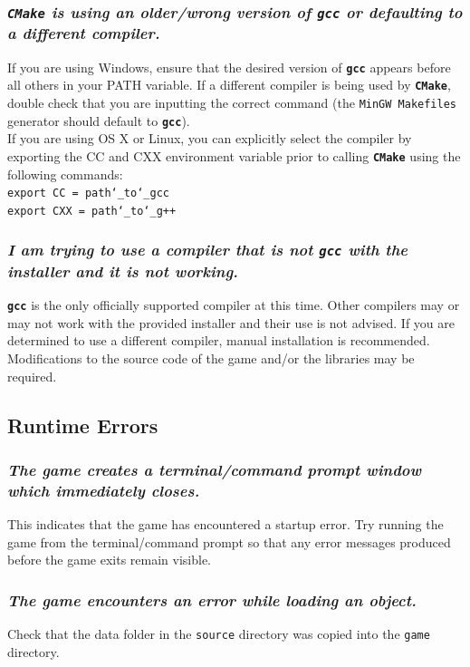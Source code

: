 \documentclass[12pt, titlepage]{article}
\begin{document}
\subsubsection{\emph{\texttt{CMake} is using an older/wrong version of \texttt{\bf gcc} or defaulting to a different compiler.}}
\noindent If you are using Windows, ensure that the desired version of \texttt{\bf gcc} appears before all others in your PATH variable.  If a different compiler is being used by \texttt{\bf CMake}, double check that you are inputting the correct command (the \texttt{MinGW Makefiles} generator should default to \texttt{\bf gcc}).\\

\noindent If you are using OS X or Linux, you can explicitly select the compiler by exporting the CC and CXX environment variable prior to calling \texttt{\bf CMake} using the following commands:\\

\noindent \qquad \texttt{export CC = path\char`_to\char`_gcc}\\
${}$\noindent \qquad \texttt{export CXX = path\char`_to\char`_g++}


\subsubsection{\emph{I am trying to use a compiler that is not \texttt{gcc} with the installer and it is not working.}}
\noindent \texttt{\bf gcc} is the only officially supported compiler at this time.  Other compilers may or may not work with the provided installer and their use is not advised.  If you are determined to use a different compiler, manual installation is recommended.  Modifications to the source code of the game and/or the libraries may be required.


\subsection{Runtime Errors}
\subsubsection{\emph{The game creates a terminal/command prompt window which immediately closes.}}
\noindent This indicates that the game has encountered a startup error.  Try running the game from the terminal/command prompt so that any error messages produced before the game exits remain visible.

\subsubsection{\emph{The game encounters an error while loading an object.}}
\noindent Check that the data folder in the \texttt{source} directory was copied into the \texttt{game} directory.
\end{document}
